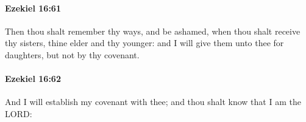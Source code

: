 		\paragraph{Ezekiel 16:61} %
			\label{EZEKIEL-16-61}

			Then thou shalt remember thy ways, and be ashamed, when thou shalt receive thy sisters, thine elder and thy younger: and I will give them unto thee for daughters, but not by thy covenant.


		\paragraph{Ezekiel 16:62} %
			\label{EZEKIEL-16-62}

			And I will establish my covenant with thee; and thou shalt know that I am the LORD:


